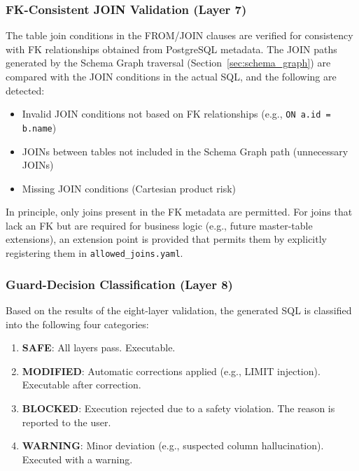 \documentclass[5p,twocolumn]{elsarticle}
\begin{document}
\subsubsection{FK-Consistent JOIN Validation (Layer 7)}
\label{sec:join_validation}

The table join conditions in the FROM/JOIN clauses are verified for consistency with
FK relationships obtained from PostgreSQL metadata.
The JOIN paths generated by the Schema Graph traversal (Section~\ref{sec:schema_graph}) are compared with
the JOIN conditions in the actual SQL, and the following are detected:

\begin{itemize}
  \item Invalid JOIN conditions not based on FK relationships (e.g., \texttt{ON a.id = b.name})
  \item JOINs between tables not included in the Schema Graph path (unnecessary JOINs)
  \item Missing JOIN conditions (Cartesian product risk)
\end{itemize}

In principle, only joins present in the FK metadata are permitted.
For joins that lack an FK but are required for business logic (e.g., future master-table extensions),
an extension point is provided that permits them by explicitly registering them in
\texttt{allowed\_joins.yaml}.

\subsubsection{Guard-Decision Classification (Layer 8)}
\label{sec:guard_categories}

Based on the results of the eight-layer validation, the generated SQL is classified into the following four categories:

\begin{enumerate}
  \item \textbf{SAFE}: All layers pass. Executable.
  \item \textbf{MODIFIED}: Automatic corrections applied (e.g., LIMIT injection). Executable after correction.
  \item \textbf{BLOCKED}: Execution rejected due to a safety violation. The reason is reported to the user.
  \item \textbf{WARNING}: Minor deviation (e.g., suspected column hallucination). Executed with a warning.
\end{enumerate}
\end{document}
